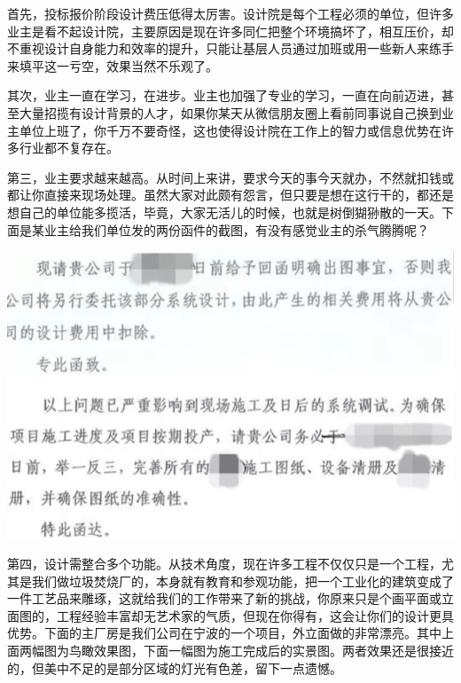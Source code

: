 \documentclass[]{book}
\begin{document}
首先，投标报价阶段设计费压低得太厉害。设计院是每个工程必须的单位，但许多业主是看不起设计院，主要原因是现在许多同仁把整个环境搞坏了，相互压价，却不重视设计自身能力和效率的提升，只能让基层人员通过加班或用一些新人来练手来填平这一亏空，效果当然不乐观了。

其次，业主一直在学习，在进步。业主也加强了专业的学习，一直在向前迈进，甚至大量招揽有设计背景的人才，如果你某天从微信朋友圈上看前同事说自己换到业主单位上班了，你千万不要奇怪，这也使得设计院在工作上的智力或信息优势在许多行业都不复存在。

第三，业主要求越来越高。从时间上来讲，要求今天的事今天就办，不然就扣钱或都让你直接来现场处理。虽然大家对此颇有怨言，但只要是想在这行干的，都还是想自己的单位能多揽活，毕竟，大家无活儿的时候，也就是树倒猢狲散的一天。下面是某业主给我们单位发的两份函件的截图，有没有感觉业主的杀气腾腾呢？

\includegraphics[width=8.33in]{images/sisi4}

第四，设计需整合多个功能。从技术角度，现在许多工程不仅仅只是一个工程，尤其是我们做垃圾焚烧厂的，本身就有教育和参观功能，把一个工业化的建筑变成了一件工艺品来雕琢，这就给我们的工作带来了新的挑战，你原来只是个画平面或立面图的，工程经验丰富却无艺术家的气质，但现在你得有，这会让你们的设计更具优势。下面的主厂房是我们公司在宁波的一个项目，外立面做的非常漂亮。其中上面两幅图为鸟瞰效果图，下面一幅图为施工完成后的实景图。两者效果还是很接近的，但美中不足的是部分区域的灯光有色差，留下一点遗憾。
\end{document}
